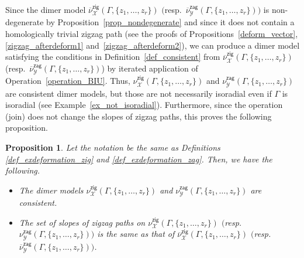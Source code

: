 \documentclass[pdftex]{sigma}%
\numberwithin{equation}{section}
\numberwithin{figure}{section}
\numberwithin{table}{section}
\newtheorem{Proposition}[Theorem]{Proposition}
 { \theoremstyle{definition}
\newtheorem{Definition}[Theorem]{Definition}
\newtheorem{Note}[Theorem]{Note}
\newtheorem{Example}[Theorem]{Example}
\newtheorem{Remark}[Theorem]{Remark}
\newtheorem{observation}[Theorem]{Observation}
\newtheorem{operation}[Theorem]{Operation}
\newtheorem{setting}[Theorem]{Setting}}
\newcommand{\calX}{\mathcal{X}}
\newcommand{\calY}{\mathcal{Y}}
\newcommand{\zig}{\mathsf{zig}}
\newcommand{\zag}{\mathsf{zag}}
\begin{document}
Since the dimer model $\overline{\nu}^\zig_\calX(\Gamma, \{z_1,\dots,z_r\})$ $($resp.\ $\overline{\nu}^\zag_\calY(\Gamma, \{z_1,\dots,z_r\})$$)$ is non-degenerate by Proposition~\ref{prop_nondegenerate}
and since it does not contain a homologically trivial zigzag path (see the proofs of Propositions~\ref{deform_vector}, \ref{zigzag_afterdeform1} and~\ref{zigzag_afterdeform2}),
we can produce a dimer model satisfying the conditions in Definition~\ref{def_consistent}
from $\overline{\nu}^\zig_\calX(\Gamma, \{z_1,\dots,z_r\})$ (resp.\ $\overline{\nu}^\zag_\calY(\Gamma, \{z_1,\dots,z_r\})$)
by iterated application of Operation~\ref{operation_BIU}.
Thus, $\nu^\zig_\calX(\Gamma, \{z_1,\dots,z_r\})$ and $\nu^\zag_\calY(\Gamma, \{z_1,\dots,z_r\})$ are consistent dimer models, but those are not necessarily isoradial even if $\Gamma$ is isoradial (see Example~\ref{ex_not_isoradial}).
Furthermore, since the operation (join) does not change the slopes of zigzag paths, this proves the following proposition.

\begin{Proposition}\label{prop_make_consistent}
Let the notation be the same as Definitions {\rm \ref{def_exdeformation_zig}} and {\rm \ref{def_exdeformation_zag}}.
Then, we have the following.
\begin{itemize}\itemsep=0pt
\item[\rm (1)] The dimer models $\nu^\zig_\calX(\Gamma, \{z_1,\dots,z_r\})$ and $\nu^\zag_\calY(\Gamma, \{z_1,\dots,z_r\})$ are consistent.
\item[\rm (2)] The set of slopes of zigzag paths on $\nu^\zig_\calX(\Gamma, \{z_1,\dots,z_r\})$ $($resp.\ $\nu^\zag_\calY(\Gamma, \{z_1,\dots,z_r\})$$)$
is the same as that of $\overline{\nu}^\zig_\calX(\Gamma, \{z_1,\dots,z_r\})$ $($resp.\ $\overline{\nu}^\zag_\calY(\Gamma, \{z_1,\dots,z_r\})$$)$.
\end{itemize}
\end{Proposition}
\end{document}
